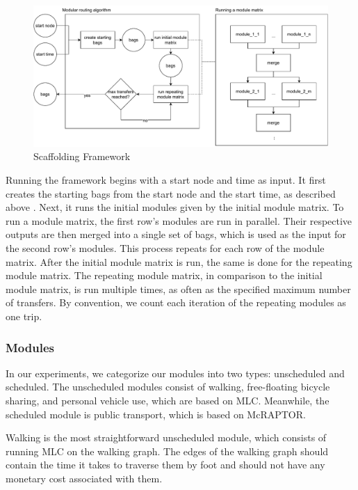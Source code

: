 \begin{figure}[h]
    \centering
    \includegraphics[scale=0.50]{Figures/method/modular_routing_algorithm}
    \caption{Scaffolding Framework}
    \label{fig:modular_routing_algorithm}
\end{figure}

Running the framework begins with a start node and time as input.
It first creates the starting bags from the start node and the start time, as described above  .
Next, it runs the initial modules given by the initial module matrix.
To run a module matrix, the first row's modules are run in parallel.
Their respective outputs are then merged into a single set of bags, which is used as the input for the second row's modules.
This process repeats for each row of the module matrix.
After the initial module matrix is run, the same is done for the repeating module matrix.
The repeating module matrix, in comparison to the initial module matrix, is run multiple times, as often as the specified maximum number of transfers.
By convention, we count each iteration of the repeating modules as one trip.

\subsubsection{Modules}
\label{subsubsec:modules}

In our experiments, we categorize our modules into two types: unscheduled and scheduled. 
The unscheduled modules consist of walking, free-floating bicycle sharing, and personal vehicle use, which are based on MLC. Meanwhile, the scheduled module is public transport, which is based on McRAPTOR.

Walking is the most straightforward unscheduled module, which consists of running MLC on the walking graph.
The edges of the walking graph should contain the time it takes to traverse them by foot and should not have any monetary cost associated with them.


